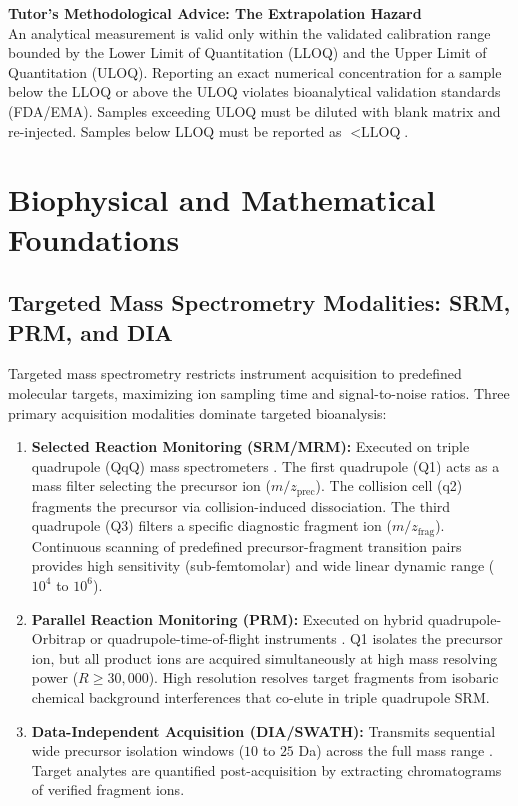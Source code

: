 \documentclass[11pt,twoside,openright]{book}
\begin{document}
\begin{notebox}
\textbf{Tutor's Methodological Advice: The Extrapolation Hazard}\\
An analytical measurement is valid only within the validated calibration range bounded by the Lower Limit of Quantitation (LLOQ) and the Upper Limit of Quantitation (ULOQ). Reporting an exact numerical concentration for a sample below the LLOQ or above the ULOQ violates bioanalytical validation standards (FDA/EMA). Samples exceeding ULOQ must be diluted with blank matrix and re-injected. Samples below LLOQ must be reported as $<\text{LLOQ}$.
\end{notebox}

\section{Biophysical and Mathematical Foundations}

\subsection{Targeted Mass Spectrometry Modalities: SRM, PRM, and DIA}
Targeted mass spectrometry restricts instrument acquisition to predefined molecular targets, maximizing ion sampling time and signal-to-noise ratios. Three primary acquisition modalities dominate targeted bioanalysis:
\begin{enumerate}
    \item \textbf{Selected Reaction Monitoring (SRM/MRM):} Executed on triple quadrupole (QqQ) mass spectrometers \cite{picotti2012selected, lange2008selected}. The first quadrupole (Q1) acts as a mass filter selecting the precursor ion ($m/z_{\text{prec}}$). The collision cell (q2) fragments the precursor via collision-induced dissociation. The third quadrupole (Q3) filters a specific diagnostic fragment ion ($m/z_{\text{frag}}$). Continuous scanning of predefined precursor-fragment transition pairs provides high sensitivity (sub-femtomolar) and wide linear dynamic range ($10^4$ to $10^6$).
    \item \textbf{Parallel Reaction Monitoring (PRM):} Executed on hybrid quadrupole-Orbitrap or quadrupole-time-of-flight instruments \cite{gallien2012targeted, peterson2012parallel}. Q1 isolates the precursor ion, but all product ions are acquired simultaneously at high mass resolving power ($R \ge 30,000$). High resolution resolves target fragments from isobaric chemical background interferences that co-elute in triple quadrupole SRM.
    \item \textbf{Data-Independent Acquisition (DIA/SWATH):} Transmits sequential wide precursor isolation windows ($10$ to $25$ Da) across the full mass range \cite{gillet2012targeted}. Target analytes are quantified post-acquisition by extracting chromatograms of verified fragment ions.
\end{enumerate}
\end{document}
